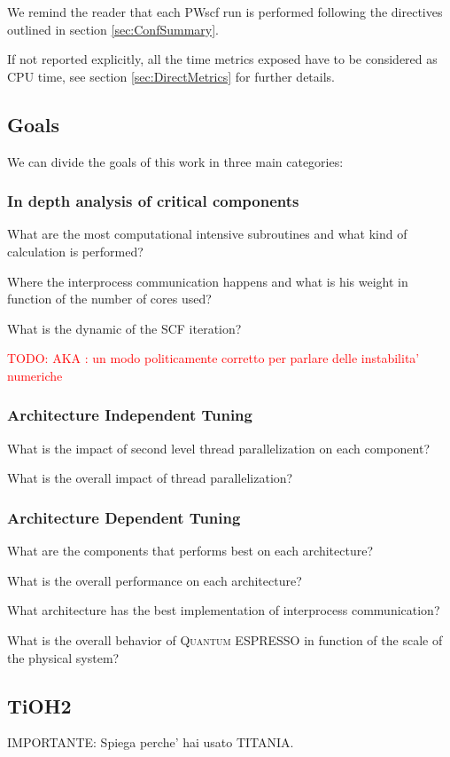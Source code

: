 \documentclass[a4paper,12pt]{article}
\newcommand\mynotes[1]{\begin{flushright}

\textcolor{red}{TODO: #1}\end{flushright}}
\newcommand\QE{\textsc{Quantum} ESPRESSO }
\begin{document}
We remind the reader that each PWscf run is performed following the directives outlined in section \ref{sec:ConfSummary}.

If not reported explicitly, all the time metrics exposed have to be considered as CPU time, see section \ref{sec:DirectMetrics} for further details.

\newpage

\subsection{Goals}\label{sec:Goals}
We can divide the goals of this work in three main categories:


\subsubsection{In depth analysis of critical components}
What are the most computational intensive subroutines and what kind of calculation is performed?

Where the interprocess communication happens and what is his weight in function of the number of cores used?

What is the dynamic of the SCF iteration?
\mynotes{AKA : un modo politicamente corretto per parlare delle instabilita' numeriche}

\subsubsection{Architecture Independent Tuning}

What is the impact of second level thread parallelization on each component?

What is the overall impact of thread parallelization?


\subsubsection{Architecture Dependent Tuning}
What are the components that performs best on each architecture?

What is the overall performance on each architecture?

What architecture has the best implementation of interprocess communication?

What is the overall behavior of \QE in function of the scale of the physical system?

\newpage

\subsection{TiOH2}
IMPORTANTE: Spiega perche' hai usato TITANIA.
\end{document}
